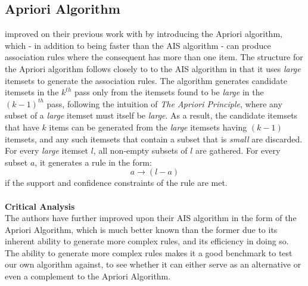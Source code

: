 \subsection{Apriori Algorithm}
\label{sec:apriori}
 improved on their previous work with  by introducing the Apriori algorithm, which - in addition to being faster than the AIS algorithm - can produce association rules where the consequent has more than one item. The structure for the Apriori algorithm follows closely to to the AIS algorithm in that it uses \textit{large} itemsets to generate the association rules.
The algorithm generates candidate itemsets in the $k^{th}$ pass only from the itemsets found to be \textit{large} in the $(k-1)^{th}$ pass, following the intuition of \textit{The Apriori Principle}, where any subset of a \textit{large} itemset must itself be \textit{large}. As a result, the candidate itemsets that have $k$ items can be generated from the \textit{large} itemsets having $(k-1)$ itemsets, and any such itemsets that contain a subset that is \textit{small} are discarded.
For every \textit{large} itemset $l$, all non-empty subsets of $l$ are gathered. For every subset $a$, it generates a rule in the form:
\[ a \rightarrow (l-a) \]
if the support and confidence constraints of the rule are met.
\\\\\textbf{Critical Analysis}\\
The authors have further improved upon their AIS algorithm in the form of the Apriori Algorithm, which is much better known than the former due to its inherent ability to generate more complex rules, and its efficiency in doing so. The ability to generate more complex rules makes it a good benchmark to test our own algorithm against, to see whether it can either serve as an alternative or even a complement to the Apriori Algorithm.


